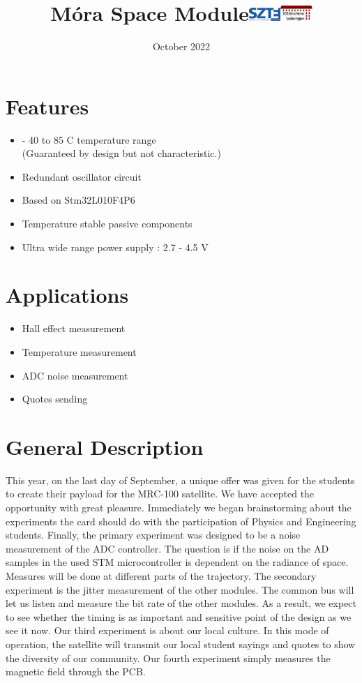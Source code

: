 \documentclass[10pt]{datasheet}
\title{Móra Space Module\hfill\includegraphics[width=0.09\textwidth]{szte}\hspace{0.3cm}\includegraphics[width=0.09\textwidth]{mora}}
\date{October 2022}
\begin{document}
\maketitle

\section{Features}

\begin{itemize}
	\item{- 40 to 85 \textdegree C temperature range \\ (Guaranteed by design but not characteristic.)}
\item{Redundant oscillator circuit}
\item{Based on Stm32L010F4P6}
\item{Temperature stable passive components}
\item{Ultra wide range power supply : 2.7 - 4.5 V}
\end{itemize}

\section{Applications}

\begin{itemize}
\item{Hall effect measurement}
\item{Temperature measurement}
\item{ADC noise measurement}
\item{Quotes sending}
\end{itemize}

\section{General Description}
This year, on the last day of September, a unique offer was given for the students to create their payload for the MRC-100 satellite. We have accepted the opportunity with great pleasure. Immediately we began brainstorming about the experiments the card should do with the participation of Physics and Engineering students. Finally, the primary experiment was designed to be a noise measurement of the ADC controller. The question is if the noise on the AD samples in the used STM microcontroller is dependent on the radiance of space. Measures will be done at different parts of the trajectory.
The secondary experiment is the jitter measurement of the other modules. The common bus will let us listen and measure the bit rate of the other modules. As a result, we expect to see whether the timing is as important and sensitive point of the design as we see it now.
Our third experiment is about our local culture. In this mode of operation, the satellite will transmit our local student sayings and quotes to show the diversity of our community. 
Our fourth experiment simply measures the magnetic field through the PCB.
\end{document}
